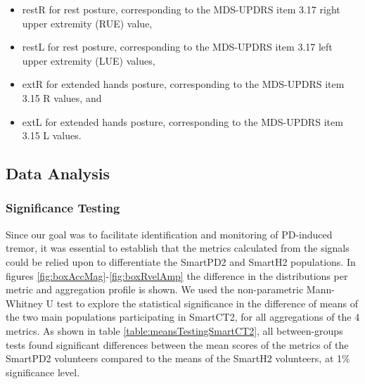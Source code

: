 \begin{itemize}
\item restR for rest posture, corresponding to the \gls{MDS}-\gls{UPDRS} item 3.17 right upper extremity (\gls{RUE}) value,
\item restL for rest posture, corresponding to the \gls{MDS}-\gls{UPDRS} item 3.17 left upper extremity (\gls{LUE}) values,
\item extR for extended hands posture, corresponding to the \gls{MDS}-\gls{UPDRS} item 3.15 R values, and
\item extL for extended hands posture, corresponding to the \gls{MDS}-\gls{UPDRS} item 3.15 L values. 
\end{itemize}

\subsection{Data Analysis}
\label{subsec:SmartCT2Analysis}
\subsubsection{Significance Testing}
\label{subsubsec:SmartCT2SignificanceTesting}
Since our goal was to facilitate identification and monitoring of \gls{PD}-induced tremor, it was essential to establish that the metrics calculated from the signals could be relied upon to differentiate the \gls{SmartPD2} and \gls{SmartH2} populations. In figures \ref{fig:boxAccMag}-\ref{fig:boxRvelAmp} the difference in the distributions per metric and aggregation profile is shown. We used the non-parametric Mann-Whitney U test to explore the statistical significance in the difference of means of the two main populations participating in \gls{SmartCT2}, for all aggregations of the 4 metrics. As shown in table \ref{table:meansTestingSmartCT2}, all between-groups tests found significant differences between the mean scores of the metrics of the \gls{SmartPD2} volunteers compared to the means of the \gls{SmartH2} volunteers, at 1\% significance level.  

